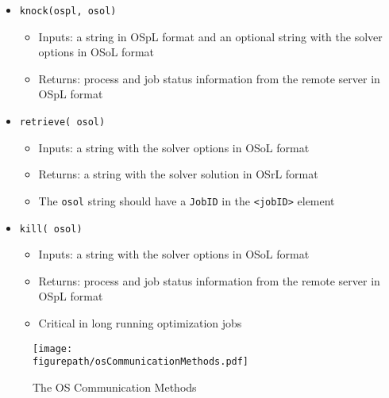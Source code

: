 \documentclass[11pt]{article}
\newcommand{\figurepath}{./figures}
\renewcommand{\_}{{\char"5F}}
\renewcommand{\{}{{\char"7B}}
\renewcommand{\}}{{\char"7D}}
\renewcommand{\^}{{\char"0D}}
\renewcommand{\'}{{\char"0D}}
\begin{document}
\begin{itemize}
\item {\tt knock(ospl, osol)}

\begin{itemize}

\item Inputs: a string in OSpL format and an optional string with the solver options in OSoL format

\item  Returns: process and job status information from the remote server in OSpL format

\end{itemize}

\item {\tt retrieve( osol)}


\begin{itemize}

\item Inputs: a string with the solver options  in OSoL format

\item Returns: a string with the solver solution in OSrL format

\item The {\tt osol} string should have a {\tt JobID} in the {\tt <jobID>} element

\end{itemize}

\item {\tt kill( osol)}


\begin{itemize}

\item Inputs: a string with the solver options  in OSoL format

\item  Returns: process and job status information from the remote server in OSpL format

\item  Critical in long running optimization jobs

\end{itemize}

\end{itemize}



\begin{figure}[ht]
\centering
\texttt{[image: \\figurepath/osCommunicationMethods.pdf]}
\caption{The OS Communication Methods}
\label{figure:osCommunicationMethods}
\end{figure}
\end{document}
